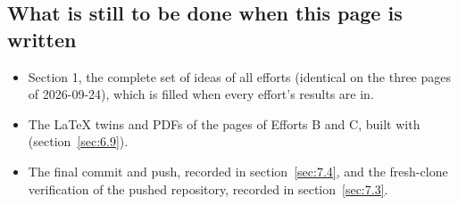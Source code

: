 \subsection{What is still to be done when this page is written}
\label{sec:8.5}

\begin{itemize}
  \item Section 1, the complete set of ideas of all efforts (identical on the three pages of 2026-09-24), which is filled when every effort's results are in.
  \item The LaTeX twins and PDFs of the pages of Efforts B and C, built with  (section~\ref{sec:6.9}).
  \item The final commit and push, recorded in section~\ref{sec:7.4}, and the fresh-clone verification of the pushed repository, recorded in section~\ref{sec:7.3}.
\end{itemize}


